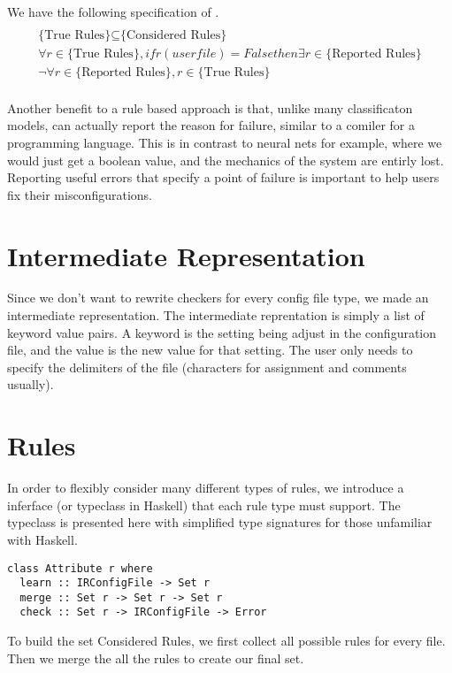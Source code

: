 We have the following specification of \app.
\begin{multline*}\\
\text{\{True Rules\}} \subseteq \text{\{Considered Rules\}} \\
\forall r \in \text{\{True Rules\}}, if r(userfile)=False then \exists r \in \text{\{Reported Rules\}} \\
\neg \forall r \in \text{\{Reported Rules\}}, r \in \text{\{True Rules\}} \\
\end{multline*}

Another benefit to a rule based approach is that, unlike many classificaton models, \app can actually report the reason for failure, similar to a comiler for a programming language.
This is in contrast to neural nets for example, where we would just get a boolean value, and the mechanics of the system are entirly lost.
Reporting useful errors that specify a point of failure is important to help users fix their misconfigurations.

\section{Intermediate Representation}

Since we don't want to rewrite checkers for every config file type, we made an intermediate representation.
The intermediate reprentation is simply a list of keyword value pairs.
A keyword is the setting being adjust in the configuration file, and the value is the new value for that setting.
The user only needs to specify the delimiters of the file (characters for assignment and comments usually).

\section{Rules}

In order to flexibly consider many different types of rules, we introduce a inferface (or typeclass in Haskell) that each rule type must support.
The typeclass is presented here with simplified type signatures for those unfamiliar with Haskell.

\begin{lstlisting}
class Attribute r where
  learn :: IRConfigFile -> Set r
  merge :: Set r -> Set r -> Set r
  check :: Set r -> IRConfigFile -> Error
\end{lstlisting} 

To build the set Considered Rules, we first collect all possible rules for every file.
Then we merge the all the rules to create our final set.

